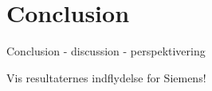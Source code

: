 \chapter{Conclusion}

Conclusion - discussion - perspektivering

Vis resultaternes indflydelse for Siemens!
